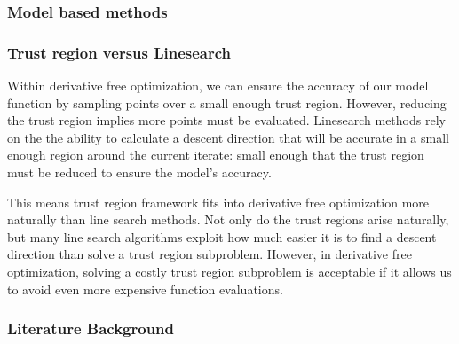 \subsubsection{Model based methods}



\subsubsection{Trust region versus Linesearch} \label{linevsmodel}

Within derivative free optimization, we can ensure the accuracy of our model function by sampling points over a small enough trust region.
However, reducing the trust region implies more points must be evaluated.
Linesearch methods rely on the the ability to calculate a descent direction that will be accurate in a small enough region around the current iterate:
small enough that the trust region must be reduced to ensure the model's accuracy.

This means trust region framework fits into derivative free optimization more naturally than line search methods.
Not only do the trust regions arise naturally, but many line search algorithms exploit how much easier it is to find a descent direction than solve a trust region subproblem.
However, in derivative free optimization, solving a costly trust region subproblem is acceptable if it allows us to avoid even more expensive function evaluations.





\subsubsection{Literature Background}

